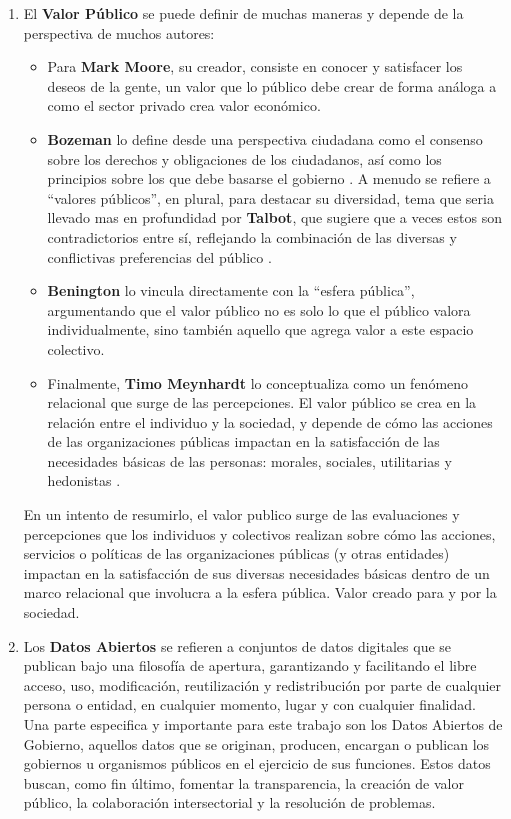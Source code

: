 \begin{enumerate}
	\item El \textbf{Valor Público} se puede definir de muchas maneras y depende de la perspectiva de muchos autores:
	\label{def3} 
	\begin{itemize}
		\item[\textbullet] Para \textbf{Mark Moore}, su creador, consiste en conocer y satisfacer los deseos de la gente, un valor que lo público debe crear de forma análoga a como el sector privado crea valor económico. \citep{moore1995creating}
		\item[\textbullet] \textbf{Bozeman} lo define desde una perspectiva ciudadana como el consenso sobre los derechos y obligaciones de los ciudadanos, así como los principios sobre los que debe basarse el gobierno  \citep{bozeman2007public}. A menudo se refiere a ``valores públicos'', en plural, para destacar su diversidad, tema que seria llevado mas en profundidad por \textbf{Talbot}, que sugiere que a veces estos son contradictorios entre sí, reflejando la combinación de las diversas y conflictivas preferencias del público \citep{Talbot01012011}.
		\item[\textbullet] \textbf{Benington} lo vincula directamente con la ``esfera pública'', argumentando que el valor público no es solo lo que el público valora individualmente, sino también aquello que agrega valor a este espacio colectivo. \citep{Benington19032009}
		\item[\textbullet] Finalmente, \textbf{Timo Meynhardt} lo conceptualiza como un fenómeno relacional que surge de las percepciones. El valor público se crea en la relación entre el individuo y la sociedad, y depende de cómo las acciones de las organizaciones públicas impactan en la satisfacción de las necesidades básicas de las personas: morales, sociales, utilitarias y hedonistas  \citep{Meynhardt19032009}.
	\end{itemize}
	
	En un intento de resumirlo, el valor publico surge de las evaluaciones y percepciones que los individuos y colectivos realizan sobre cómo las acciones, servicios o políticas de las organizaciones públicas (y otras entidades) impactan en la satisfacción de sus diversas necesidades básicas dentro de un marco relacional que involucra a la esfera pública. Valor creado para y por la sociedad. \\


	\item Los \textbf{Datos Abiertos} \label{def4} se refieren a conjuntos de datos digitales que se publican bajo una filosofía de apertura, garantizando y facilitando el libre acceso, uso, modificación, reutilización y redistribución por parte de cualquier persona o entidad, en cualquier momento, lugar y con cualquier finalidad. Una parte especifica y importante para este trabajo son los Datos Abiertos de Gobierno, aquellos datos que se originan, producen, encargan o publican los gobiernos u organismos públicos en el ejercicio de sus funciones. Estos datos buscan, como fin último, fomentar la transparencia, la creación de valor público, la colaboración intersectorial y la resolución de problemas.
	

\end{enumerate}
